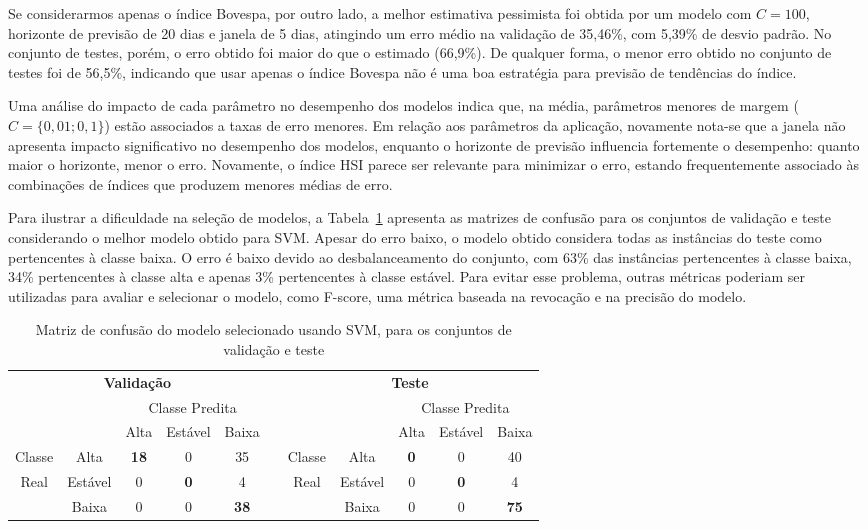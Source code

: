 \documentclass[12pt,a4paper,utf8]{ppgsi}
\begin{document}
        Se considerarmos apenas o índice Bovespa, por outro lado, a melhor estimativa pessimista foi obtida por um modelo com $C=100$, horizonte de previsão de 20 dias e janela de 5 dias, atingindo um erro médio na validação de 35,46\%, com 5,39\% de desvio padrão. No conjunto de testes, porém, o erro obtido foi maior do que o estimado (66,9\%). De qualquer forma, o menor erro obtido no conjunto de testes foi de 56,5\%, indicando que usar apenas o índice Bovespa não é uma boa estratégia para previsão de tendências do índice.

        Uma análise do impacto de cada parâmetro no desempenho dos modelos indica que, na média, parâmetros menores de margem ($C=\{0,01;0,1\}$) estão associados a taxas de erro menores. Em relação aos parâmetros da aplicação, novamente nota-se que a janela não apresenta impacto significativo no desempenho dos modelos, enquanto o horizonte de previsão influencia fortemente o desempenho: quanto maior o horizonte, menor o erro. Novamente, o índice HSI parece ser relevante para minimizar o erro, estando frequentemente associado às combinações de índices que produzem menores médias de erro.
				
				Para ilustrar a dificuldade na seleção de modelos, a Tabela~\ref{tab:confusao-svm} apresenta as matrizes de confusão para os conjuntos de validação e teste considerando o melhor modelo obtido para SVM. Apesar do erro baixo, o modelo obtido considera todas as instâncias do teste como pertencentes à classe baixa. O erro é baixo devido ao desbalanceamento do conjunto, com 63\% das instâncias pertencentes à classe baixa, 34\% pertencentes à classe alta e apenas 3\% pertencentes à classe estável. Para evitar esse problema, outras métricas poderiam ser utilizadas para avaliar e selecionar o modelo, como F-score, uma métrica baseada na revocação e na precisão do modelo.
				
				    \begin{table}[htb]
    \caption{Matriz de confusão do modelo selecionado usando SVM, para os conjuntos de validação e teste}
    \label{tab:confusao-svm}
    \centering
    \begin{tabular}{|ccccc|c|ccccc|}
		\cline{1-5} \cline{7-11}
		\multicolumn{5}{|c|}{\textbf{Validação}} & & \multicolumn{5}{|c|}{\textbf{Teste}} \\ 
		\cline{1-5} \cline{7-11}
                      &   & \multicolumn{3}{c|}{Classe Predita} & & &  & \multicolumn{3}{c|}{Classe Predita} \\
               &   & Alta  & Estável   & Baixa & &   & & Alta  & Estável   & Baixa    \\
Classe & Alta & \textbf{18}    & 0     & 35 & 	&			Classe   & Alta & \textbf{0}    & 0     & 40\\
Real   & Estável & 0   & \textbf{0}    & 4 & 		&			Real& Estável & 0   & \textbf{0}    & 4   \\
                                & Baixa & 0    & 0 & \textbf{38}   & && Baixa & 0    & 0 & \textbf{75}  \\
\cline{1-5} \cline{7-11}
    \end{tabular}
    \end{table}
\end{document}
